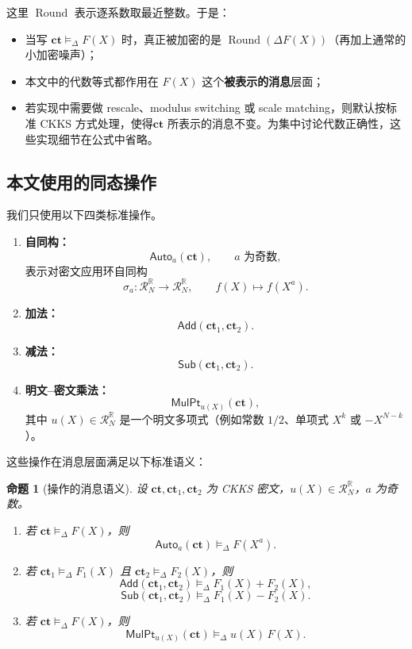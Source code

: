 \documentclass[11pt,a4paper]{ctexart}
\newcommand{\RR}{\mathbb{R}}
\newcommand{\Auto}[1]{\mathsf{Auto}_{#1}}
\newcommand{\Add}{\mathsf{Add}}
\newcommand{\Sub}{\mathsf{Sub}}
\newcommand{\MulPt}[1]{\mathsf{MulPt}_{#1}}
\newcommand{\Round}{\operatorname{Round}}
\newcommand{\ct}{\mathbf{ct}}
\newcommand{\Rbig}{\mathcal{R}_N^{\RR}}
\newcommand{\rep}{\mathrel{\vDash_{\Delta}}}
\newtheorem{proposition}[definition]{命题}
\begin{document}
这里 \(\Round\) 表示逐系数取最近整数。于是：

\begin{itemize}
    \item 当写 \(\ct \rep F(X)\) 时，真正被加密的是 \(\Round(\Delta F(X))\)（再加上通常的小加密噪声）；
    \item 本文中的代数等式都作用在 \(F(X)\) 这个\textbf{被表示的消息}层面；
    \item 若实现中需要做 rescale、modulus switching 或 scale matching，则默认按标准 CKKS 方式处理，使得\(\ct\) 所表示的消息不变。为集中讨论代数正确性，这些实现细节在公式中省略。
\end{itemize}

\subsection{本文使用的同态操作}

我们只使用以下四类标准操作。

\begin{enumerate}[label=(\roman*)]
    \item \textbf{自同构：}
    \[
    \Auto{a}(\ct), \qquad a \text{ 为奇数},
    \]
    表示对密文应用环自同构
    \[
    \sigma_a:\Rbig\to\Rbig,\qquad f(X)\mapsto f(X^a).
    \]

    \item \textbf{加法：}
    \[
    \Add(\ct_1,\ct_2).
    \]

    \item \textbf{减法：}
    \[
    \Sub(\ct_1,\ct_2).
    \]

    \item \textbf{明文--密文乘法：}
    \[
    \MulPt{u(X)}(\ct),
    \]
    其中 \(u(X)\in \Rbig\) 是一个明文多项式（例如常数 \(1/2\)、单项式 \(X^k\) 或 \(-X^{N-k}\)）。
\end{enumerate}

这些操作在消息层面满足以下标准语义：

\begin{proposition}[操作的消息语义]
设 \(\ct,\ct_1,\ct_2\) 为 CKKS 密文，\(u(X)\in\Rbig\)，\(a\) 为奇数。
\begin{enumerate}[label=(\arabic*)]
    \item 若 \(\ct \rep F(X)\)，则
    \[
    \Auto{a}(\ct)\rep F(X^a).
    \]
    \item 若 \(\ct_1\rep F_1(X)\) 且 \(\ct_2\rep F_2(X)\)，则
    \[
    \Add(\ct_1,\ct_2)\rep F_1(X)+F_2(X),
    \]
    \[
    \Sub(\ct_1,\ct_2)\rep F_1(X)-F_2(X).
    \]
    \item 若 \(\ct\rep F(X)\)，则
    \[
    \MulPt{u(X)}(\ct)\rep u(X)\,F(X).
    \]
\end{enumerate}
\end{proposition}
\end{document}
